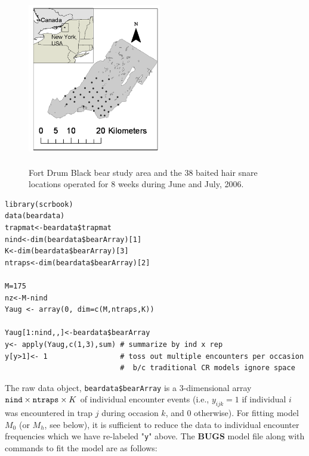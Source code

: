 \begin{figure}[ht]
\centering
\includegraphics[height=3in,width=2.28in]{Ch4-Closed/figs/hairsnares.png}
\caption{Fort Drum Black bear study area and the 38 baited hair snare
  locations operated for 8 weeks during June and July, 2006.}
\label{closed.fig.fortdrum}
\end{figure}

{\small
\begin{verbatim}
library(scrbook)
data(beardata)
trapmat<-beardata$trapmat
nind<-dim(beardata$bearArray)[1]
K<-dim(beardata$bearArray)[3]
ntraps<-dim(beardata$bearArray)[2]

M=175
nz<-M-nind
Yaug <- array(0, dim=c(M,ntraps,K))

Yaug[1:nind,,]<-beardata$bearArray
y<- apply(Yaug,c(1,3),sum) # summarize by ind x rep
y[y>1]<- 1                 # toss out multiple encounters per occasion
                           #  b/c traditional CR models ignore space
\end{verbatim}
}


The raw data object, \mbox{\tt beardata\$bearArray} is a 3-dimensional
array $\mbox{\tt nind} \times \mbox{\tt ntraps} \times K$ of
individual encounter events (i.e., $y_{ijk} = 1$ if individual $i$ was
encountered in trap $j$ during occasion $k$, and 0 otherwise).  For
fitting model $M_{0}$ (or $M_{h}$, see below), it is sufficient to
reduce the data to individual encounter frequencies which we have
re-labeled "\mbox{\tt y}" above.  The {\bf BUGS} model file along with
commands to fit the model are as follows:

